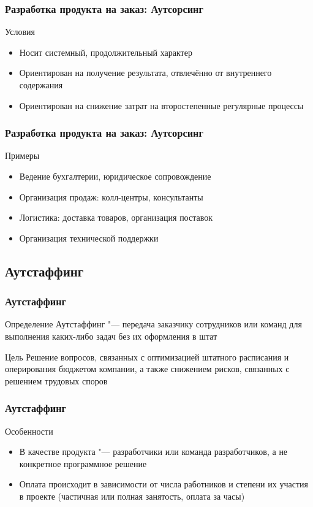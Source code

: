 \documentclass{../industrial-development}
\begin{document}
\begin{frame} \frametitle{Разработка продукта на заказ: Аутсорсинг}
	\begin{block}{Условия}
		\begin{itemize}
			\item Носит системный, продолжительный характер
			\item Ориентирован на получение результата, отвлечённо от внутреннего содержания
			\item Ориентирован на снижение затрат на второстепенные регулярные процессы
		\end{itemize}
	\end{block}
\end{frame}
\lecturenotes


\begin{frame} \frametitle{Разработка продукта на заказ: Аутсорсинг}
	\begin{block}{Примеры}
		\begin{itemize}
			\item Ведение бухгалтерии, юридическое сопровождение
			\item Организация продаж: колл-центры, консультанты
			\item Логистика: доставка товаров, организация поставок
			\item Организация технической поддержки
		\end{itemize}
	\end{block}
\end{frame}
\lecturenotes


\subsection{Аутстаффинг}


\begin{frame} \frametitle{Аутстаффинг}
	\begin{block}{Определение}
		\alert{Аутстаффинг} "--- передача заказчику сотрудников или команд для выполнения каких-либо задач без их оформления в штат
	\end{block}
	\begin{block}{Цель}
		Решение вопросов, связанных с оптимизацией штатного расписания и оперирования бюджетом компании, а также снижением рисков, связанных с решением трудовых споров
	\end{block}
\end{frame}
\lecturenotes


\begin{frame} \frametitle{Аутстаффинг}
	\begin{block}{Особенности}
		\begin{itemize}
			\item В качестве продукта "--- разработчики или команда разработчиков, а не конкретное программное решение
			\item Оплата происходит в зависимости от числа работников и степени их участия в проекте (частичная или полная занятость, оплата за часы)
		\end{itemize}
	\end{block}
\end{frame}
\lecturenotes
\end{document}
